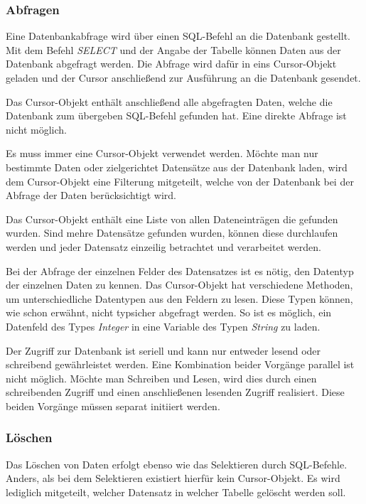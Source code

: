 \subsubsection{Abfragen}

Eine Datenbankabfrage wird über einen SQL-Befehl an die Datenbank gestellt. Mit dem Befehl \textit{SELECT} und der Angabe der Tabelle können Daten aus der Datenbank abgefragt werden. Die Abfrage wird dafür in eins Cursor-Objekt geladen und der Cursor anschließend zur Ausführung an die Datenbank gesendet.

Das Cursor-Objekt enthält anschließend alle abgefragten Daten, welche die Datenbank zum übergeben SQL-Befehl gefunden hat. Eine direkte Abfrage ist nicht möglich.

Es muss immer eine Cursor-Objekt verwendet werden. Möchte man nur bestimmte Daten oder zielgerichtet Datensätze aus der Datenbank laden, wird dem Cursor-Objekt eine Filterung mitgeteilt, welche von der Datenbank bei der Abfrage der Daten berücksichtigt wird.

Das Cursor-Objekt enthält eine Liste von allen Dateneinträgen die gefunden wurden. Sind mehre Datensätze gefunden wurden, können diese durchlaufen werden und jeder Datensatz einzeilig betrachtet und verarbeitet werden.

Bei der Abfrage der einzelnen Felder des Datensatzes ist es nötig, den Datentyp der einzelnen Daten zu kennen. Das Cursor-Objekt hat verschiedene Methoden, um unterschiedliche Datentypen aus den Feldern zu lesen. Diese Typen können, wie schon erwähnt, nicht typsicher abgefragt werden. So ist es möglich, ein Datenfeld des Types \textit{Integer} in eine Variable des Typen \textit{String} zu laden.

Der Zugriff zur Datenbank ist seriell und kann nur entweder lesend oder schreibend gewährleistet werden. Eine Kombination beider Vorgänge parallel ist nicht möglich. Möchte man Schreiben und Lesen, wird dies durch einen schreibenden Zugriff und einen anschließenen lesenden Zugriff realisiert. Diese beiden Vorgänge müssen separat initiiert werden.

\subsubsection{Löschen}

Das Löschen von Daten erfolgt ebenso wie das Selektieren durch SQL-Befehle. Anders, als bei dem Selektieren existiert hierfür kein Cursor-Objekt. Es wird lediglich mitgeteilt, welcher Datensatz in welcher Tabelle gelöscht werden soll.

